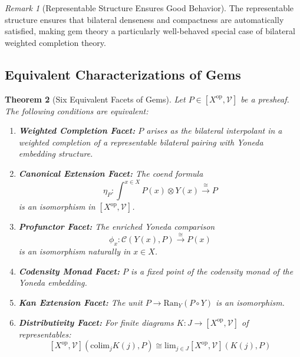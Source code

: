 \documentclass[11pt]{article}
\theoremstyle{plain}
\newtheorem{theorem}{Theorem}[section]
\theoremstyle{definition}
\theoremstyle{remark}
\newtheorem{remark}[theorem]{Remark}
\newcommand{\V}{\mathcal{V}}
\newcommand{\C}{\mathcal{C}}
\newcommand{\op}{\mathrm{op}}
\newcommand{\colim}{\mathrm{colim}}
\renewcommand{\lim}{\mathrm{lim}}
\begin{document}
\begin{remark}[Representable Structure Ensures Good Behavior]
The representable structure ensures that bilateral denseness and compactness are automatically satisfied, making gem theory a particularly well-behaved special case of bilateral weighted completion theory.
\end{remark}

\subsection{Equivalent Characterizations of Gems}

\begin{theorem}[Six Equivalent Facets of Gems]\label{thm:gem-equivalences}
Let $P \in [X^{\op}, \V]$ be a presheaf. The following conditions are equivalent:

\begin{enumerate}
\item \textbf{Weighted Completion Facet:} $P$ arises as the bilateral interpolant in a weighted completion of a representable bilateral pairing with Yoneda embedding structure.

\item \textbf{Canonical Extension Facet:} The coend formula
$$\eta_P : \int^{x \in X} P(x) \otimes Y(x) \xrightarrow{\cong} P$$
is an isomorphism in $[X^{\op}, \V]$.

\item \textbf{Profunctor Facet:} The enriched Yoneda comparison
$$\phi_x : \C(Y(x), P) \xrightarrow{\cong} P(x)$$
is an isomorphism naturally in $x \in X$.

\item \textbf{Codensity Monad Facet:} $P$ is a fixed point of the codensity monad of the Yoneda embedding.

\item \textbf{Kan Extension Facet:} The unit $P \to \text{Ran}_Y(P \circ Y)$ is an isomorphism.

\item \textbf{Distributivity Facet:} For finite diagrams $K : J \to [X^{\op}, \V]$ of representables:
$$[X^{\op}, \V](\colim_j K(j), P) \cong \lim_{j \in J} [X^{\op}, \V](K(j), P)$$
\end{enumerate}
\end{theorem}
\end{document}

